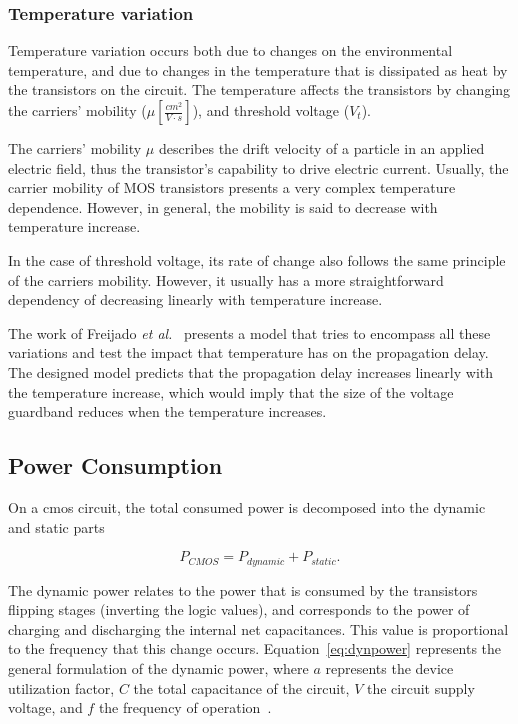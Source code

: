 \subsubsection{Temperature variation}

Temperature variation occurs both due to changes on the environmental temperature, and due to changes in the temperature that is dissipated as heat by the transistors on the circuit. The temperature affects the transistors by changing the carriers' mobility ($ \mu [\frac{cm^2}{V\cdot s}]$), and threshold voltage ($V_t$)\cite{wolpert_temperature_2012}.

The carriers' mobility $ \mu $ describes the drift velocity of a particle in an applied electric field, thus the transistor's capability to drive electric current. Usually, the carrier mobility of MOS transistors presents a very complex temperature dependence. However, in general, the mobility is said to decrease with temperature increase. 

In the case of threshold voltage, its rate of change also follows the same principle of the carriers mobility. However, it usually has a more straightforward dependency of decreasing linearly with temperature increase.

The work of Freijado \textit{et al.}~\cite{freijedo_modeling_2012} presents a model that tries to encompass all these variations and test the impact that temperature has on the propagation delay. The designed model predicts that the propagation delay increases linearly with the temperature increase, which would imply that the size of the voltage guardband reduces when the temperature increases. 

\subsection{Power Consumption}
\label{sec:power_consumption}
On a \acrshort{cmos} circuit, the total consumed power is decomposed into the dynamic and static parts

\begin{equation}
    P_{CMOS} = P_{dynamic} + P_{static}.
    \label{eq:power}
\end{equation}

The dynamic power relates to the power that is consumed by the transistors flipping stages (inverting the logic values), and corresponds to the power of charging and discharging the internal net capacitances. This value is proportional to the frequency that this change occurs. Equation~\ref{eq:dynpower} represents the general formulation of the dynamic power, where $a$ represents the device utilization factor, $C$ the total capacitance of the circuit, $V$ the circuit supply voltage, and $f$ the frequency of operation~\cite{gonzalez_supply_1997}.

